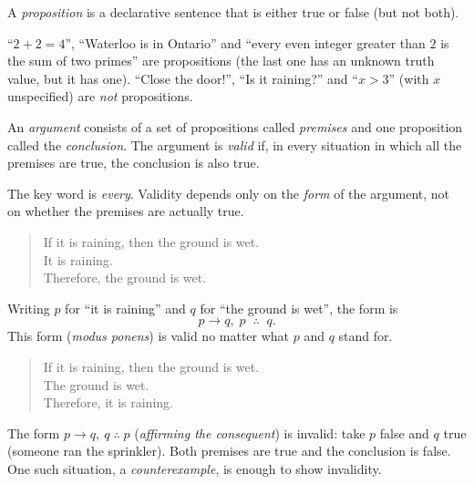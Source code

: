 \begin{definition}[Proposition]
A \emph{proposition} is a declarative sentence that is either true or false (but not
both).
\end{definition}

\begin{example}
``$2+2=4$'', ``Waterloo is in Ontario'' and ``every even integer greater than $2$ is the sum
of two primes'' are propositions (the last one has an unknown truth value, but it has
one). ``Close the door!'', ``Is it raining?'' and ``$x > 3$'' (with $x$ unspecified) are
\emph{not} propositions.
\end{example}

\begin{definition}[Argument]
An \emph{argument} consists of a set of propositions called \emph{premises} and one
proposition called the \emph{conclusion}. The argument is \emph{valid} if, in every
situation in which all the premises are true, the conclusion is also true.
\end{definition}

The key word is \emph{every}. Validity depends only on the \emph{form} of the argument,
not on whether the premises are actually true.

\begin{example}
\begin{quote}
If it is raining, then the ground is wet.\\
It is raining.\\
Therefore, the ground is wet.
\end{quote}
Writing $p$ for ``it is raining'' and $q$ for ``the ground is wet'', the form is
\[
  p \to q,\; p \;\;\therefore\;\; q.
\]
This form (\emph{modus ponens}) is valid no matter what $p$ and $q$ stand for.
\end{example}

\begin{example}
\begin{quote}
If it is raining, then the ground is wet.\\
The ground is wet.\\
Therefore, it is raining.
\end{quote}
The form $p\to q,\ q \;\therefore\; p$ (\emph{affirming the consequent}) is invalid: take
$p$ false and $q$ true (someone ran the sprinkler). Both premises are true and the
conclusion is false. One such situation, a \emph{counterexample}, is enough to show
invalidity.
\end{example}

